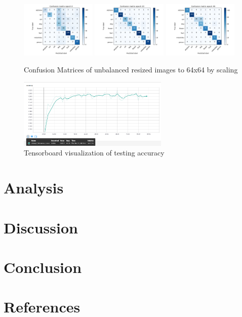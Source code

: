 \documentclass{article}
\begin{document}
\begin{figure}[!htb]
	\begin{center}
	\includegraphics[width=0.32\textwidth]{./figures/cm_h64_w64_r_none_e0.png}
	\includegraphics[width= 0.32\textwidth]{./figures/cm_h64_w64_r_none_e20.png}
	\includegraphics[width= 0.32\textwidth]{./figures/cm_h64_w64_r_none_e49.png}
	\caption{Confusion Matrices of unbalanced resized images to 64x64 by scaling}
	\end{center}
\end{figure}



\begin{figure}[!htb]
	\begin{center}
		\includegraphics[width=0.64\textwidth]{./figures/acc_h64_w64_r_none.png}
	\end{center}
	\caption{Tensorboard visualization of testing accuracy}
\end{figure}

\newpage

\section{Analysis}

\section{Discussion}

\section{Conclusion	}

\section{References	}
\end{document}
